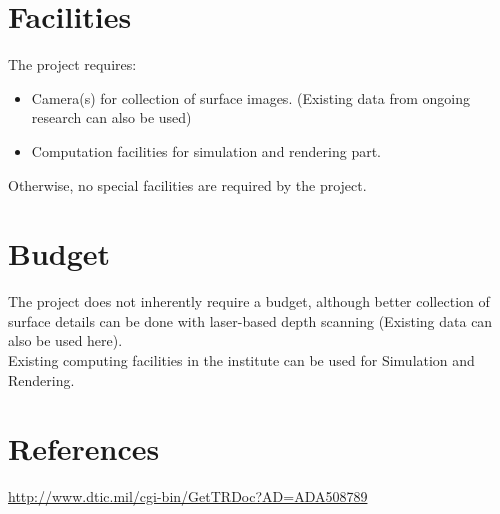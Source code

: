 \documentclass[12pt]{article}
\begin{document}
\section{Facilities}

The project requires:
\begin{itemize}
\item Camera(s) for collection of surface images. (Existing data from ongoing research can also be used)
\item Computation facilities for simulation and rendering part.
\end{itemize}
Otherwise, no special facilities are required by the project.


\section{Budget}

The project does not inherently require a budget, although better collection of surface details can be done with laser-based depth scanning (Existing data can also be used here).\\
Existing computing facilities in the institute can be used for Simulation and Rendering.


\section{References}

\url{http://www.dtic.mil/cgi-bin/GetTRDoc?AD=ADA508789}
\end{document}
